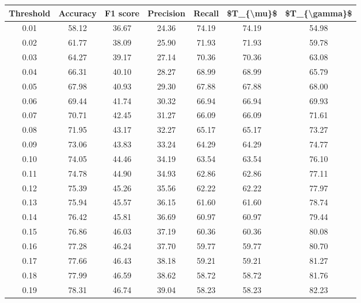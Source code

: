 \begin{tabular}{|c|c|c|c|c|c|c|}
\hline
 Threshold &  Accuracy &  F1 score &  Precision &  Recall &  \$T\_\{\textbackslash mu\}\$ &  \$T\_\{\textbackslash gamma\}\$ \\
\hline
      0.01 &     58.12 &     36.67 &      24.36 &   74.19 &      74.19 &         54.98 \\
      0.02 &     61.77 &     38.09 &      25.90 &   71.93 &      71.93 &         59.78 \\
      0.03 &     64.27 &     39.17 &      27.14 &   70.36 &      70.36 &         63.08 \\
      0.04 &     66.31 &     40.10 &      28.27 &   68.99 &      68.99 &         65.79 \\
      0.05 &     67.98 &     40.93 &      29.30 &   67.88 &      67.88 &         68.00 \\
      0.06 &     69.44 &     41.74 &      30.32 &   66.94 &      66.94 &         69.93 \\
      0.07 &     70.71 &     42.45 &      31.27 &   66.09 &      66.09 &         71.61 \\
      0.08 &     71.95 &     43.17 &      32.27 &   65.17 &      65.17 &         73.27 \\
      0.09 &     73.06 &     43.83 &      33.24 &   64.29 &      64.29 &         74.77 \\
      0.10 &     74.05 &     44.46 &      34.19 &   63.54 &      63.54 &         76.10 \\
      0.11 &     74.78 &     44.90 &      34.93 &   62.86 &      62.86 &         77.11 \\
      0.12 &     75.39 &     45.26 &      35.56 &   62.22 &      62.22 &         77.97 \\
      0.13 &     75.94 &     45.57 &      36.15 &   61.60 &      61.60 &         78.74 \\
      0.14 &     76.42 &     45.81 &      36.69 &   60.97 &      60.97 &         79.44 \\
      0.15 &     76.86 &     46.03 &      37.19 &   60.36 &      60.36 &         80.08 \\
      0.16 &     77.28 &     46.24 &      37.70 &   59.77 &      59.77 &         80.70 \\
      0.17 &     77.66 &     46.43 &      38.18 &   59.21 &      59.21 &         81.27 \\
      0.18 &     77.99 &     46.59 &      38.62 &   58.72 &      58.72 &         81.76 \\
      0.19 &     78.31 &     46.74 &      39.04 &   58.23 &      58.23 &         82.23 \\

\end{tabular}
